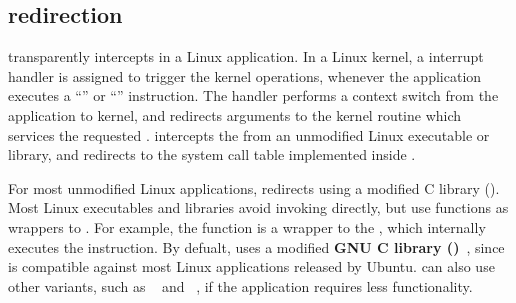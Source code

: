 \subsection{\Linuxapi{} redirection}


\thelibos{} transparently intercepts \linuxapis{} in a Linux application. In a Linux kernel, a \linuxapi{} interrupt handler is assigned
to trigger the kernel operations,
whenever the application executes
a ``'' or ``'' instruction.
The handler
performs a context switch from the application to kernel,
and redirects \linuxapi{} arguments to the kernel routine which services the requested \linuxapi{}.
\thelibos{} intercepts the \linuxapis{}
from an unmodified Linux executable or library, and redirects
to the system call table implemented inside \thelibos{}.


For most unmodified Linux applications,
\thelibos{} redirects \linuxapis{} using a modified C library (\libc{}).
Most Linux executables and libraries avoid invoking \linuxapis{} directly,
but use \libc{} functions as wrappers to \linuxapis{}.
For example, the \libc{} function  is a wrapper to the  \linuxapi{},
which internally executes
the  instruction.
By defualt, \thelibos{} uses a modified
{\bf GNU C library (\glibc{})}~\cite{glibc},
since \glibc{} is compatible against most Linux applications released by Ubuntu. %
\graphene{} can also use other \libc{} variants,
such as ~\cite{uclibc} and ~\cite{musl},
if the application requires less \libc{} functionality.




